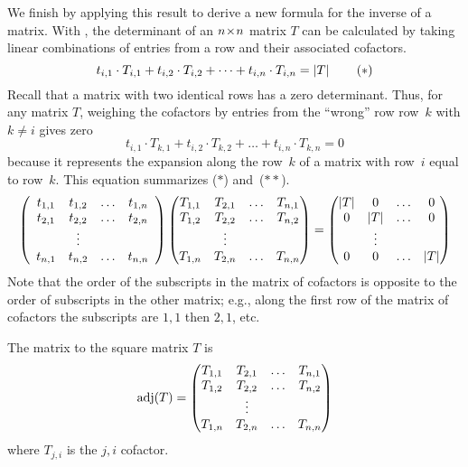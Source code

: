 We finish by applying this result to
derive a new formula for the inverse of a matrix.
With , 
the determinant of an \( n \! \times \! n \) matrix \( T \)
can be calculated by taking linear combinations of entries from a row and
their associated cofactors.
\begin{equation*}
  t_{i,1}\cdot T_{i,1}+t_{i,2}\cdot T_{i,2}+\dots+t_{i,n}\cdot T_{i,n}
   =\deter{T}  
\tag*{($*$)}\end{equation*}
Recall that a matrix with two identical rows has a zero determinant.
Thus, for any matrix \( T \),
weighing the cofactors by entries from the
``wrong'' row \Dash  row~$k$ with $k\neq i$ \Dash  gives zero
\begin{equation*}
  t_{i,1}\cdot T_{k,1}+t_{i,2}\cdot T_{k,2}+\dots+t_{i,n}\cdot T_{k,n}=0
\tag*{($**$)}\end{equation*}
because it represents the expansion along the row~$k$ of a matrix with 
row~\( i \) equal to row~\( k \).
This equation summarizes ($*$) and~($**$).
\begin{equation*}
 \left( \begin{array}{cccc} t_{1,1} &t_{1,2} &\ldots &t_{1,n} \\ t_{2,1} &t_{2,2} &\ldots &t_{2,n} \\ &\vdots \\ t_{n,1} &t_{n,2} &\ldots &t_{n,n} \end{array} \right)
 \begin{pmatrix}
   T_{1,1}  &T_{2,1}  &\ldots  &T_{n,1}  \\
   T_{1,2}  &T_{2,2}  &\ldots  &T_{n,2}  \\
            &\vdots   &        &         \\
   T_{1,n}  &T_{2,n}  &\ldots  &T_{n,n}
 \end{pmatrix}                                  
 =\begin{pmatrix}
     |T|      &0        &\ldots  &0        \\
     0        &|T|      &\ldots  &0        \\
              &\vdots   &        &         \\
     0        &0        &\ldots  &|T|
   \end{pmatrix} 
\end{equation*}
Note that the order of the subscripts in the matrix of cofactors
is opposite to the order of subscripts in the other matrix; e.g.,
along the first row of the matrix of cofactors 
the subscripts are $1,1$ then $2,1$, etc.

\begin{definition}
The matrix 
to the square matrix \( T \) is
\begin{equation*}
  \operatorname{adj}(T)=
    \begin{pmatrix}
      T_{1,1}  &T_{2,1}  &\ldots  &T_{n,1}  \\
      T_{1,2}  &T_{2,2}  &\ldots  &T_{n,2}  \\
               &\vdots   &        &         \\
      T_{1,n}  &T_{2,n}  &\ldots  &T_{n,n}
    \end{pmatrix}
\end{equation*}
where \( T_{j,i} \) is the \( j,i \) cofactor.
\end{definition}


